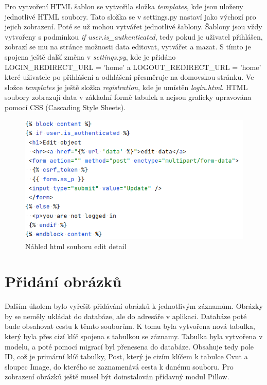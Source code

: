 Pro vytvoření HTML šablon se vytvořila složka \emph{templates}, kde
jsou uloženy jednotlivé HTML soubory. Tato složka se v settings.py
nastaví jako výchozí pro jejich zobrazení. Poté se už mohou vytvářet
jednotlivé šablony. Šablony jsou vždy vytvořeny s podmínkou \emph{if
  user.is\_authenticated}, tedy pokud je uživatel přihlášen, zobrazí
se mu na stránce možnosti data editovat, vytvářet a mazat. S tímto je
spojena ještě další změna v \emph{settings.py}, kde je přidáno
LOGIN\_REDIRECT\_URL = 'home' a LOGOUT\_REDIRECT\_URL
  = 'home' které uživatele po přihlášení a odhlášení přesměruje na
domovskou stránku. Ve složce \emph{templates} je ještě složka
\emph{registration}, kde je umístěn \emph{login.html}. HTML soubory
zobrazují data v základní formě tabulek a nejsou graficky upravována
pomocí CSS (Cascading Style Sheets).

\begin{figure}[H] \centering
    \includegraphics[width=350pt]{./pictures/8-edit-detail-html.PNG}
    \caption[Náhled html souboru edit detail]{Náhled html souboru edit detail}
	\label{fig:Náhled HTML souboru edit detail}
\end{figure}


\newpage

\section{Přidání obrázků}

Dalším úkolem bylo vyřešit přidávání obrázků k jednotlivým
záznamům. Obrázky by se neměly ukládat do databáze, ale do adresáře v
aplikaci. Databáze poté bude obsahovat cestu k těmto souborům. K tomu
byla vytvořena nová tabulka, který byla přes cizí klíč spojena s
tabulkou se záznamy. Tabulka byla vytvořena v modelu, a poté pomocí
migrací byl přenesena do databáze. Obsahuje tedy pole ID, což je
primární klíč tabulky, Post, který je cizím klíčem k tabulce Cvut a
sloupec Image, do kterého se zaznamenává cesta k danému souboru.
Pro zobrazení obrázků ještě musel být doinstalován přídavný modul Pillow.

